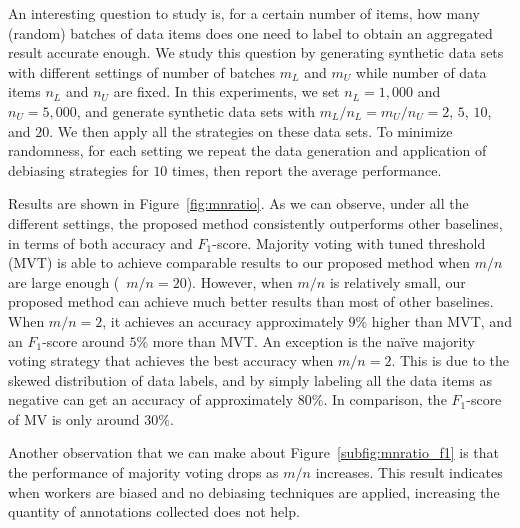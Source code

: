 An interesting question to study is, 
for a certain number of items, how many (random) batches of data items 
does one need to label to obtain an aggregated result accurate enough.
We study this question by generating synthetic data sets 
with different settings of number of batches $m_L$ and $m_U$ while number of data items $n_L$ and $n_U$ are fixed.  
In this experiments, we set $n_L=1,000$ and $n_U=5,000$, 
and generate synthetic data sets with $m_L/n_L=m_U/n_U=2$, $5$, $10$, and $20$.  
We then apply all the strategies on these data sets.  
To minimize randomness, for each setting we repeat the data generation and application of debiasing strategies for $10$ times, 
then report the average performance.  

Results are shown in Figure~\ref{fig:mnratio}.  
As we can observe, under all the different settings, 
the proposed method consistently outperforms other baselines, 
in terms of both accuracy and $F_1$-score. 
Majority voting with tuned threshold (MVT) 
is able to achieve comparable results to our proposed method 
when $m/n$ are large enough (\eg~$m/n=20$).
However, when $m/n$ is relatively small, 
our proposed method can achieve much better results than most of other baselines.  
When $m/n=2$, it achieves an accuracy approximately $9\%$ higher than MVT, 
and an $F_1$-score around $5\%$ more than MVT.  
An exception is the na\"{i}ve majority voting strategy 
that achieves the best accuracy when $m/n=2$.  
This is due to the skewed distribution of data labels, 
and by simply labeling all the data items as negative can get an accuracy of approximately $80\%$.  
In comparison, the $F_1$-score of MV is only around $30\%$.  

Another observation that we can make about Figure~\ref{subfig:mnratio_f1} 
is that the performance of majority voting drops as $m/n$ increases. 
This result indicates when workers are biased and no debiasing techniques are applied, 
increasing the quantity of annotations collected does not help. 


